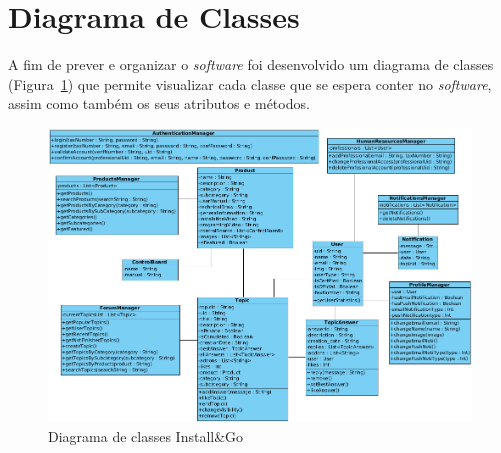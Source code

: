 \section{Diagrama de Classes}

A fim de prever e organizar o \textit{software} foi desenvolvido um diagrama de classes (Figura~\ref{fig:22}) que permite visualizar cada classe que se espera conter no \textit{software}, assim como também os seus atributos e métodos.

\begin{figure}[htb]
  \centering
  
  \includegraphics[width=\textwidth]{images/diagramas/diagrama_classes.png}
  \caption{Diagrama de classes Install\&Go}
  \label{fig:22}
\end{figure}
